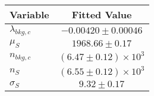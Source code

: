 \begin{tabular}[t]{lc}
\hline
Variable &Fitted Value\\
\hline\hline
$\lambda_{bkg,c}$&$-0.00420\pm0.00046$\\
\hline
$\mu_{S}$&$1968.66\pm0.17$\\
\hline
$n_{bkg,c}$&$(6.47\pm0.12)\times 10^3$\\
\hline
$n_{S}$&$(6.55\pm0.12)\times 10^3$\\
\hline
$\sigma_{S}$&$9.32\pm0.17$\\
\hline
\end{tabular}
